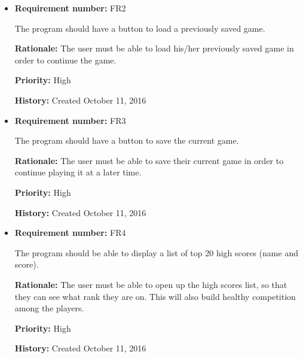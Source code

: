 \documentclass[12pt,letterpaper]{article}
\begin{document}
\begin{reqbox}
	\begin{itemize}

		\item \textbf{Requirement number: }FR2  
		
		 The program should have a button to load a previously saved game.

		\textbf{Rationale: }The user must be able to load his/her previously saved game in order to continue the game.

		\textbf{Priority: }High

		\textbf{History: }Created October 11, 2016
	\end{itemize}
\end{reqbox}

\begin{reqbox}
	\begin{itemize}

		\item \textbf{Requirement number: }FR3

		The program should have a button to save the current game.

		\textbf{Rationale: }The user must be able to save their current game in order to continue playing it at a later time.

		\textbf{Priority: }High

		\textbf{History: }Created October 11, 2016

	\end{itemize}
\end{reqbox}

\begin{reqbox}
	\begin{itemize}

		\item \textbf{Requirement number: }FR4

		The program should be able to display a list of top 20 high scores (name and score). 

		\textbf{Rationale: }The user must be able to open up the high scores list, so that they can see what rank they are on. This will also build healthy competition among the players.

		\textbf{Priority: }High

		\textbf{History: }Created October 11, 2016

	\end{itemize}
\end{reqbox}
\end{document}
